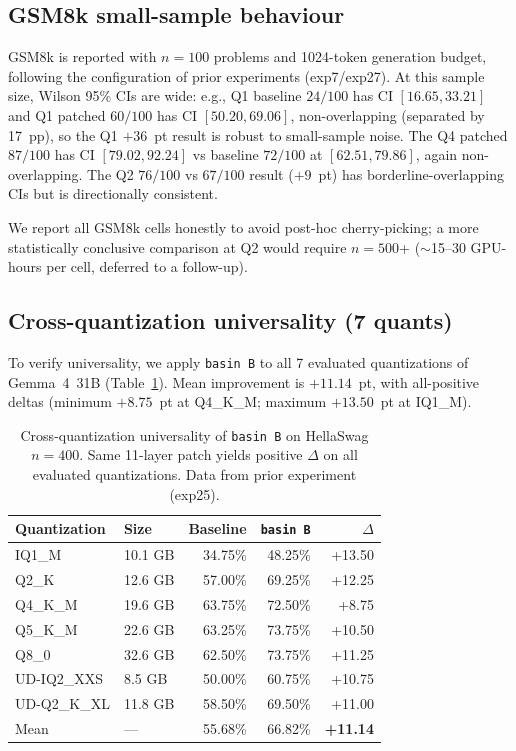 \documentclass[11pt]{article}
\begin{document}
\subsection{GSM8k small-sample behaviour}
\label{sec:gsm8k_note}

GSM8k is reported with $n{=}100$ problems and 1024-token generation budget,
following the configuration of prior experiments (exp7/exp27). At this
sample size, Wilson 95\% CIs are wide: e.g., Q1 baseline $24/100$ has CI
$[16.65, 33.21]$ and Q1 patched $60/100$ has CI $[50.20, 69.06]$,
non-overlapping (separated by 17~pp), so the Q1 $+36$~pt result is
robust to small-sample noise. The Q4 patched $87/100$ has CI
$[79.02, 92.24]$ vs baseline $72/100$ at $[62.51, 79.86]$, again
non-overlapping. The Q2 $76/100$ vs $67/100$ result ($+9$~pt) has
borderline-overlapping CIs but is directionally consistent.

We report all GSM8k cells honestly to avoid post-hoc cherry-picking; a
more statistically conclusive comparison at Q2 would require $n{=}500$+
($\sim$15--30 GPU-hours per cell, deferred to a follow-up).

\subsection{Cross-quantization universality (7 quants)}

To verify universality, we apply \texttt{basin~B} to all 7 evaluated
quantizations of Gemma~4~31B (Table~\ref{tab:univ}). Mean improvement is
$+11.14$~pt, with all-positive deltas (minimum $+8.75$~pt at Q4\_K\_M;
maximum $+13.50$~pt at IQ1\_M).

\begin{table}[h]
\centering
\small
\caption{Cross-quantization universality of \texttt{basin~B} on HellaSwag
$n{=}400$. Same 11-layer patch yields positive $\Delta$ on all evaluated
quantizations. Data from prior experiment (exp25).}
\label{tab:univ}
\begin{tabular}{llrrr}
\toprule
Quantization & Size & Baseline & \texttt{basin~B} & $\Delta$ \\
\midrule
IQ1\_M       & 10.1 GB & 34.75\% & 48.25\% & +13.50 \\
Q2\_K        & 12.6 GB & 57.00\% & 69.25\% & +12.25 \\
Q4\_K\_M     & 19.6 GB & 63.75\% & 72.50\% & +8.75 \\
Q5\_K\_M     & 22.6 GB & 63.25\% & 73.75\% & +10.50 \\
Q8\_0        & 32.6 GB & 62.50\% & 73.75\% & +11.25 \\
UD-IQ2\_XXS  &  8.5 GB & 50.00\% & 60.75\% & +10.75 \\
UD-Q2\_K\_XL & 11.8 GB & 58.50\% & 69.50\% & +11.00 \\
\midrule
Mean         & --- & 55.68\% & 66.82\% & \textbf{+11.14} \\
\bottomrule
\end{tabular}
\end{table}
\end{document}
